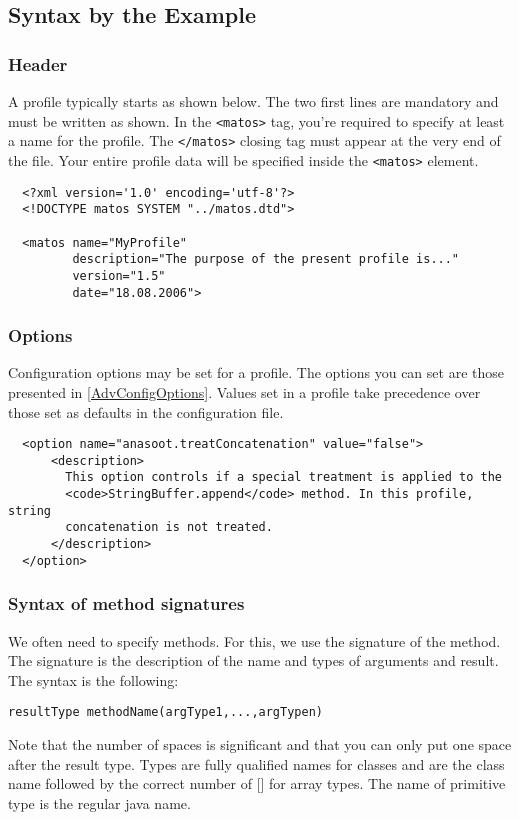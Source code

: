\subsection{Syntax by the Example}\label{ProfSyntax}

\subsubsection{Header}
A profile typically starts as shown below. The two first lines are
mandatory and must be written as shown. In the \texttt{<matos>}
tag, you're required to specify at least a name for the profile.
The \texttt{</matos>} closing tag must appear at the very end of
the file. Your entire profile data will be specified inside the
\texttt{<matos>} element.

\begin{verbatim}
  <?xml version='1.0' encoding='utf-8'?>
  <!DOCTYPE matos SYSTEM "../matos.dtd">

  <matos name="MyProfile"
         description="The purpose of the present profile is..."
         version="1.5"
         date="18.08.2006">
\end{verbatim}

\subsubsection{Options} \label{optionsSecurityProfile}
Configuration options may be set for a profile. The options you can
set are those presented in \ref{AdvConfigOptions}. Values set in a
profile take precedence over those set as defaults in the configuration
file.
\begin{verbatim}
  <option name="anasoot.treatConcatenation" value="false">
      <description>
        This option controls if a special treatment is applied to the
        <code>StringBuffer.append</code> method. In this profile, string 
        concatenation is not treated.
      </description>
  </option>
\end{verbatim}

\subsubsection{Syntax of method signatures}
We often need to specify methods. For this, we use the signature  of the method.
The signature is the description of the name and types of arguments and
result. The syntax is the following:
\begin{verbatim}
resultType methodName(argType1,...,argTypen)
\end{verbatim}
Note that the number of spaces is significant and that you can only put one
space after the result type. Types are fully qualified names for classes and
are the class name followed by the correct number of [] for array types. 
The name of primitive type is the regular java name.

